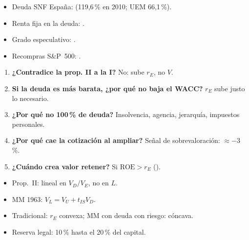\documentclass{article}
\begin{document}
\begin{columnas}
\anexorepaso
{}
\begin{itemize}
\item Deuda SNF España:  (119,6\,\% en 2010; UEM 66,1\,\%).
\item Renta fija en la deuda: .
\item Grado especulativo: .
\item Recompras S\&P~500: .
\end{itemize}
\begin{enumerate}
\item \textbf{¿Contradice la prop. II a la I?} No: sube $r_E$, no $V$.
\item \textbf{Si la deuda es más barata, ¿por qué no baja el WACC?} $r_E$ sube justo lo necesario.
\item \textbf{¿Por qué no 100\,\% de deuda?} Insolvencia, agencia, jerarquía, impuestos personales.
\item \textbf{¿Por qué cae la cotización al ampliar?} Señal de sobrevaloración: $\approx-$3\,\%.
\item \textbf{¿Cuándo crea valor retener?} Si $\mathrm{ROE}>r_E$ ().
\end{enumerate}
\begin{trampa}
\begin{itemize}
\item Prop.~II: lineal en $V_D/V_E$, no en $L$.
\item MM 1963: $V_L=V_U+t_{IS}V_D$.
\item Tradicional: $r_E$ convexa; MM con deuda con riesgo: cóncava.
\item Reserva legal: 10\,\% hasta el 20\,\% del capital.
\end{itemize}
\end{trampa}

\end{columnas}
\end{document}
